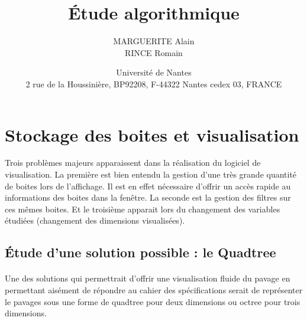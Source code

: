\documentclass[11pt,a4paper,utf8x]{report}
\title{\'Etude algorithmique}
\author{MARGUERITE Alain\\ RINCE Romain}
\date{Université de Nantes \\ 2 rue de la Houssinière, BP92208, F-44322 Nantes cedex 03, FRANCE}
\begin{document}
\maketitle
\clearpage

\tableofcontents
\clearpage
\section{Stockage des boites et visualisation}
Trois problèmes majeurs apparaissent dans la réalisation du logiciel de visualisation. La première est bien entendu la gestion d'une très grande quantité de boites lors de l'affichage. Il est en effet nécessaire d'offrir un accès rapide au informations des boites dans la fenêtre. La seconde est la gestion des filtres sur ces mêmes boites. Et le troisième apparait lors du changement des variables étudiées (changement des dimensions visualisées).

\subsection{\'Etude d'une solution possible : le Quadtree}
\paragraph{}Une des solutions qui permettrait d'offrir une visualisation fluide du pavage en permettant aisément de répondre au cahier des spécifications serait de représenter le pavages sous une forme de quadtree pour deux dimensions ou octree pour trois dimensions.
\end{document}
